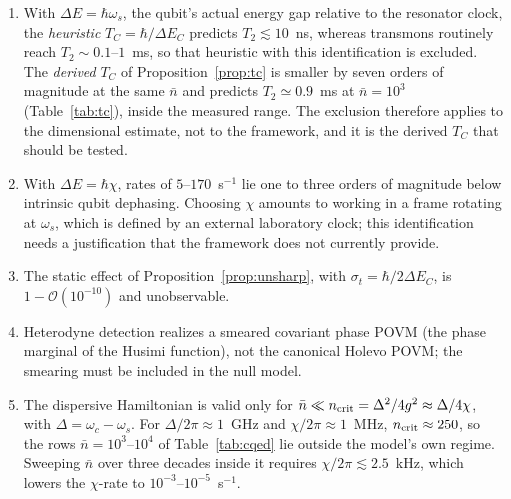 \documentclass[aps,prd,onecolumn,notitlepage,10pt,amsmath,amssymb,amsfonts,nofootinbib]{revtex4-2}
\theoremstyle{definition}
\theoremstyle{remark}
\begin{document}
\begin{enumerate}
\item With $\Delta E=\hbar\omega_s$, the qubit's actual energy gap relative to the resonator clock, the \emph{heuristic} $T_C=\hbar/\Delta E_C$ predicts $T_2\lesssim10$~ns, whereas transmons routinely reach $T_2\sim0.1$--$1$~ms, so that heuristic with this identification is excluded. The \emph{derived} $T_C$ of Proposition~\ref{prop:tc} is smaller by seven orders of magnitude at the same $\bar n$ and predicts $T_2\simeq0.9$~ms at $\bar n=10^3$ (Table~\ref{tab:tc}), inside the measured range. The exclusion therefore applies to the dimensional estimate, not to the framework, and it is the derived $T_C$ that should be tested.
\item With $\Delta E=\hbar\chi$, rates of $5$--$170$~s$^{-1}$ lie one to three orders of magnitude below intrinsic qubit dephasing. Choosing $\chi$ amounts to working in a frame rotating at $\omega_s$, which is defined by an external laboratory clock; this identification needs a justification that the framework does not currently provide.
\item The static effect of Proposition~\ref{prop:unsharp}, with $\sigma_t=\hbar/2\Delta E_C$, is $1-\mathcal O(10^{-10})$ and unobservable.
\item Heterodyne detection realizes a smeared covariant phase POVM (the phase marginal of the Husimi function), not the canonical Holevo POVM; the smearing must be included in the null model.
\item The dispersive Hamiltonian is valid only for $\bar n\ll n_{\rm crit}=\Delta^2/4g^2\approx\Delta/4\chi$, with $\Delta=\omega_c-\omega_s$. For $\Delta/2\pi\approx1$~GHz and $\chi/2\pi\approx1$~MHz, $n_{\rm crit}\approx250$, so the rows $\bar n=10^3$--$10^4$ of Table~\ref{tab:cqed} lie outside the model's own regime. Sweeping $\bar n$ over three decades inside it requires $\chi/2\pi\lesssim2.5$~kHz, which lowers the $\chi$-rate to $10^{-3}$--$10^{-5}$~s$^{-1}$.
\end{enumerate}
\end{document}
